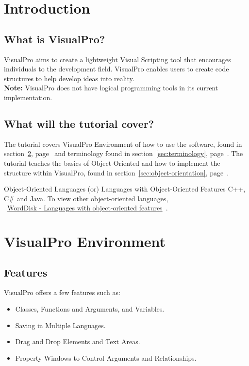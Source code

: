 \documentclass[10pt]{article}
\begin{document}
\newpage
\section{Introduction}
    \subsection{What is VisualPro?}
        VisualPro aims to create a lightweight Visual Scripting tool that encourages individuals to the development field. VisualPro enables users to create code structures to help develop ideas into reality. \\\textbf{Note:} VisualPro does not have logical programming tools in its current implementation.

    \subsection{What will the tutorial cover?}
        The tutorial covers VisualPro Environment of how to use the software, found in section~\ref{sec:vp-env}, page~\pageref{sec:vp-env} and terminology found in section~\ref{sec:terminology}, page~\pageref{sec:terminology}.
        The tutorial teaches the basics of Object-Oriented and how to implement the structure within VisualPro, found in section~\ref{sec:object-orientation}, page~\pageref{sec:object-orientation}.
        
        \begin{example}{Object-Oriented Languages (or) Languages with Object-Oriented Features}
            C++, C\# and Java. To view other object-oriented languages,\\~\href{https://worddisk.com/wiki/List_of_object-oriented_programming_languages/}{WordDisk - Languages with object-oriented features}~\cite{word_disk_list_2018}.
        \end{example}

\section{VisualPro Environment}
\label{sec:vp-env}
    \subsection{Features}
        VisualPro offers a few features such as:
        \begin{itemize}
            \item Classes, Functions and Arguments, and Variables.
            \item Saving in Multiple Languages.
            \item Drag and Drop Elements and Text Areas.
            \item Property Windows to Control Arguments and Relationships.
        \end{itemize}
\end{document}

